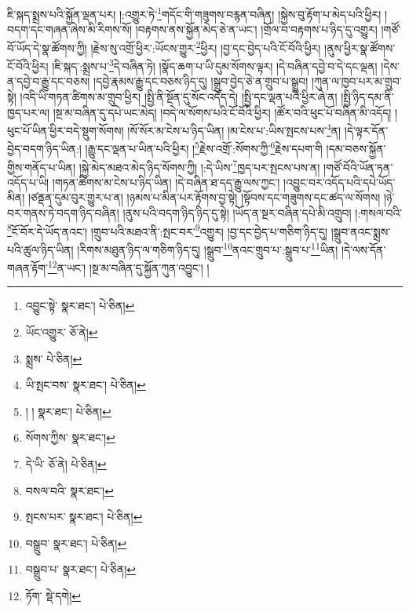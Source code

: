ཇི་སྐད་སྨྲས་པའི་སྐྱོན་ལྡན་པར། །:འགྱུར་ཏེ་\footnote{འབྱུང་སྟེ་  སྣར་ཐང་།  པེ་ཅིན། }གདོང་གི་གཟུགས་བརྙན་བཞིན། །སྐྱེས་བུ་རྟོག་པ་མེད་པའི་ཕྱིར། །བདག་དང་གཞན་ཞེས་མི་རིགས་སོ། །བརྟགས་ནས་སྐྱོན་མེད་ཅེ་ན་ཡང་། །གྲོལ་བ་བརྟགས་པ་ཉིད་དུ་འགྱུར། །གཙོ་བོ་ཡོད་དེ་སྣ་ཚོགས་ཀྱི། །རྗེས་སུ་འགྲོ་ཕྱིར་:ཡོངས་གྱུར་\footnote{ཡོང་འགྱུར་  ཅོ་ནེ། }ཕྱིར། །བྱ་དང་བྱེད་པའི་ངོ་བོའི་ཕྱིར། །ནུས་ཕྱིར་སྣ་ཚོགས་ངོ་བོའི་ཕྱིར། །ཇི་སྐད་:སྨྲས་པ་\footnote{སྨྲས་  པེ་ཅིན། }དེ་བཞིན་ཏེ། །སྣོད་ཆག་པ་ཡི་དུམ་སོགས་ལྟར། །དེ་བཞིན་དབྱེ་བ་དེ་དང་ལྡན། །དེས་ན་དབྱེ་བ་རྒྱུ་དང་བཅས། །དབྱེ་རྣམས་རྒྱུ་དང་བཅས་ཉིད་དུ། །སྒྲུབ་བྱེད་ཅེ་ན་གྲུབ་པ་སྒྲུབ། །ཀུན་ལ་ཁྱབ་པར་མ་གྲུབ་སྟེ། །འདི་ཡི་གཏན་ཚིགས་མ་གྲུབ་ཕྱིར། །སྤྱི་ནི་སྔོན་དུ་སོང་འདོད་དེ། །སྤྱི་དང་ལྡན་པའི་ཕྱིར་ཞེ་ན། །སྤྱི་ཉིད་དམ་ནི་ཁྱད་པར་ལ། །སྔ་མ་བཞིན་དུ་དཔེ་ཡང་མེད། །བདེ་ལ་སོགས་པའི་ངོ་བོའི་ཕྱིར། །ཚོར་བའི་ཕུང་པོ་བཞིན་མི་འདོད། །ཕུང་པོ་ཡིན་ཕྱིར་བདེ་སྡུག་སོགས། །སོ་སོར་མ་ངེས་པ་ཉིད་ཡིན། །མ་ངེས་པ་:ཡིས་སྤངས་པས་\footnote{ཡི་སྤང་བས་  སྣར་ཐང་།  པེ་ཅིན། }ན། །དེ་ལྟར་དོན་བྱེད་བདག་ཉིད་ཡིན:། །རྒྱུ་དང་ལྡན་པ་ཡིན་པའི་ཕྱིར། །\footnote{། །  སྣར་ཐང་།  པེ་ཅིན། }རྗེས་འགྲོ་:སོགས་ཀྱི་\footnote{སོགས་ཀྱིས་  སྣར་ཐང་། }རྗེས་དཔག་གི །དམ་བཅས་སྐྱོན་གྱིས་གནོད་པ་ཡིན། །སྐྱེ་མེད་མཐའ་མེད་ཉིད་སོགས་ཀྱི། །:དེ་ཡིས་\footnote{དེ་ཡི་  ཅོ་ནེ།  པེ་ཅིན། }ཁྱད་པར་སྤངས་པས་ན། །གཙོ་བོའི་ཡོན་ཏན་འདོད་པ་ཡི། །གཏན་ཚིགས་མ་ངེས་པ་ཉིད་ཡིན། །དེ་བཞིན་ཐ་དད་རྒྱུ་ལས་ཀྱང་། །འབྱུང་བར་འདོད་པའི་དཔེ་ཡོད་མིན། །ཙནྡན་དུམ་བུར་གྱུར་པ་ན། །ཉམས་པ་མིན་པར་རྟོགས་བྱ་སྟེ། །སྟོབས་དང་གཟུགས་དང་ཚད་ལ་སོགས། །ཉེ་བར་གནས་ཏེ་བདག་ཉིད་བཞིན། །ནུས་པའི་བདག་ཉིད་ཉིད་དུ་སྟེ། །ཡོད་ན་སྔར་བཞིན་དཔེ་མི་འགྲུབ། །:གསལ་བའི་\footnote{བསལ་བའི་  སྣར་ཐང་། }ངོ་བོར་དེ་ཡོད་ནའང་། །གྲུབ་པའི་མཐའ་ནི་:སྤང་བར་\footnote{སྤངས་པར་  སྣར་ཐང་།  པེ་ཅིན། }འགྱུར། །བྱ་དང་བྱེད་པ་གཅིག་ཉིད་དུ། །སྒྲུབ་ནའང་སྨྲས་པའི་ཚུལ་ཉིད་ཡིན། །རིགས་མཐུན་ཉིད་ལ་གཅིག་ཉིད་དུ། །སྒྲུབ་\footnote{བསྒྲུབ་  སྣར་ཐང་།  པེ་ཅིན། }ནའང་གྲུབ་པ་:སྒྲུབ་པ་\footnote{བསྒྲུབ་པ་  སྣར་ཐང་།  པེ་ཅིན། }ཡིན། །དེ་ལས་དོན་གཞན་རྟོག་\footnote{ཏོག་  སྡེ་དགེ། }ན་ཡང་། །སྔ་མ་བཞིན་དུ་སྐྱོན་ཀུན་འབྱུང་། །
